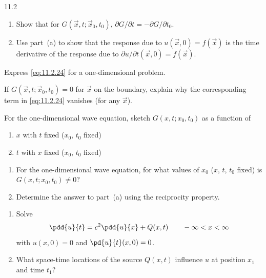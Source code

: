 \begin{exercises}{11.2}

\item \label{ex:11.2.1}
\begin{enumerate}
\item[(a)] Show that for $G(\vec{x},t;\vec{x}_0,t_0)$, $\partial G/\partial t = -\partial G/\partial t_0$.
\item[(b)] Use part~(a) to show that the response due to $u(\vec{x},0) = f(\vec{x})$ is the time derivative of the response due to $\partial u/\partial t(\vec{x},0) = f(\vec{x})$.
\end{enumerate}

\item \label{ex:11.2.2}
Express \eqref{eq:11.2.24} for a one-dimensional problem.

\item \label{ex:11.2.3}
If $G(\vec{x},t;\vec{x}_0,t_0) = 0$ for $\vec{x}$ on the boundary, explain why the corresponding term in \eqref{eq:11.2.24} vanishes (for any $\vec{x}$).

\item \label{ex:11.2.4}
For the one-dimensional wave equation, sketch $G(x,t;x_0,t_0)$ as a function of
\begin{enumerate}
\item[(a)] $x$ with $t$ fixed ($x_0$, $t_0$ fixed)
\item[(b)] $t$ with $x$ fixed ($x_0$, $t_0$ fixed)
\end{enumerate}

\item \label{ex:11.2.5}
\begin{enumerate}
\item[(a)] For the one-dimensional wave equation, for what values of $x_0$ ($x$, $t$, $t_0$ fixed) is $G(x,t;x_0,t_0) \ne 0$?
\item[(b)] Determine the answer to part~(a) using the reciprocity property.
\end{enumerate}

\item \label{ex:11.2.6}
\begin{enumerate}
\item[(a)] Solve
\[
\pdd{u}{t} = c^2\pdd{u}{x} + Q(x,t) \qquad -\infty < x < \infty
\]
with $u(x,0) = 0$ and $\pd{u}{t}(x,0) = 0$.
\item[\starred (b)] What space-time locations of the source $Q(x,t)$ influence $u$ at position $x_1$ and time $t_1$?
\end{enumerate}


\end{exercises}
